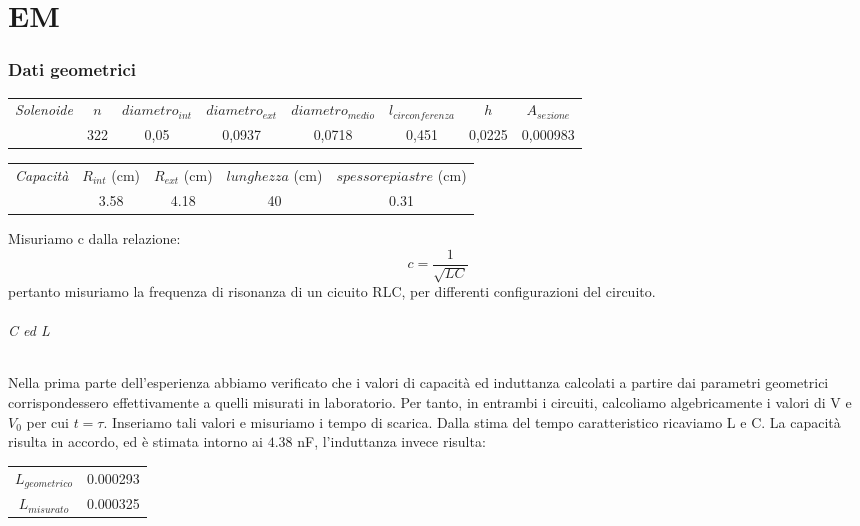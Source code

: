 \chapter{EM}

\subsection{Dati geometrici}
\begin{center}
\begin{tabular}{|c|c|c|c|c|c|c|c|}
\midrule
\textit{Solenoide} & $n$ & $diametro_{int}$ & $diametro_{ext}$ & $diametro_{medio}$ & $l_{circonferenza}$ & $h$ & $A_{sezione}$  \\
		   & 322 & 0,05	 & 0,0937  & 0,0718 & 0,451 & 0,0225 &	0,000983 \\
 \midrule
\end{tabular}
\end{center}


\begin{center}
\begin{tabular}{|c|c|c|c|c|}
\midrule
\textit{Capacità} & $R_{int}$ (cm) & $R_{ext}$ (cm) & $lunghezza$ (cm) & $spessore piastre$ (cm)\\
   & 3.58 & 4.18  & 40  & 0.31 \\

 \midrule
\end{tabular}
\end{center}


Misuriamo c dalla relazione:
\begin{equation}
 c=\frac{1}{\sqrt{LC}}
\end{equation}
pertanto misuriamo la frequenza di risonanza di un cicuito RLC, per differenti configurazioni del circuito.

\subparagraph*{C ed L}
Nella prima parte dell'esperienza abbiamo verificato che i valori di capacità ed induttanza calcolati a partire dai parametri geometrici corrispondessero effettivamente a quelli misurati in laboratorio. 
Per tanto, in entrambi i circuiti, calcoliamo algebricamente i valori di V e $V_{0}$ per cui $t = \tau$. Inseriamo tali valori e misuriamo i tempo di scarica. Dalla stima del tempo caratteristico ricaviamo L e C. La capacità risulta in accordo, ed è stimata intorno ai $4.38$ nF, l'induttanza invece risulta:

\begin{center}
\begin{tabular}{c c}
$L_{geometrico}$  & 0.000293\\
$L_{misurato}$ & 0.000325\\
\end{tabular}
\end{center}


